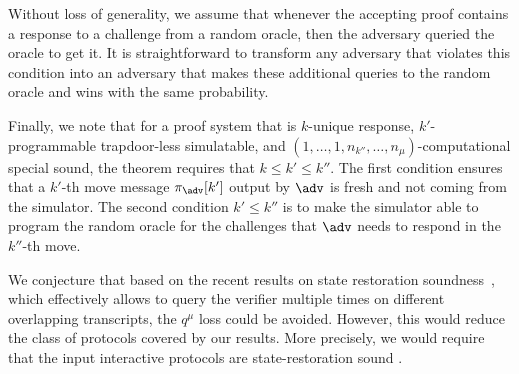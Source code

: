 Without loss of generality, we assume that whenever the accepting proof contains a
response to a challenge from a random oracle, then the adversary queried the oracle
to get it. It is straightforward to transform any adversary that violates this
condition into an adversary that makes these additional queries to the random oracle
and wins with the same probability.

Finally, we note that for a proof system that is $k$-unique response, $k'$-programmable trapdoor-less simulatable, and $(1, \ldots, 1, n_{k''}, \ldots, n_\mu)$-computational special sound, the theorem requires that $k \leq k' \leq k''$. The first condition ensures that a $k'$-th move message $\zkproof_{\advse}[k']$ output by $\adv$ is fresh and not coming from the simulator. The second condition $k' \leq k''$ is to make the simulator able to program the random oracle for the challenges that $\advse$ needs to respond in the $k''$-th move.


%

 We conjecture that based on the recent results on state restoration
soundness~\cite{C:GhoTes21}, which effectively allows to query the verifier multiple
times on different overlapping transcripts, the $q^{\mu}$ loss could be
avoided. However, this would reduce the class of protocols covered by our
results. More precisely, we would require that the input interactive protocols are
state-restoration sound \cite{TCC:BenChiSpo16}.

